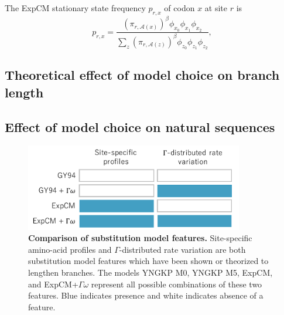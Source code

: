 \documentclass[11pt]{article}
\begin{document}
The ExpCM stationary state frequency $p_{r,x}$ of codon $x$ at site $r$ is~\citep{bloom2017identification} 
\begin{equation}
\label{eq:p_rx}
p_{r,x} = \frac{\left(\pi_{r,\mathcal{A}\left(x\right)}\right)^{\beta} \phi_{x_0} \phi_{x_1} \phi_{x_2}}{\sum_z \left(\pi_{r,\mathcal{A}\left(z\right)}\right)^{\beta} \phi_{z_0} \phi_{z_1} \phi_{z_2}},
\end{equation}
\subsection*{Theoretical effect of model choice on branch length}
\subsection*{Effect of model choice on natural sequences}

\begin{figure}
\centerline{\includegraphics[width=0.85\textwidth]{figures/model_feature}}
\caption{\label{model_feature}
\textbf{Comparison of substitution model features.}
Site-specific amino-acid profiles and $\Gamma$-distributed rate variation are both substitution model features which have been shown or theorized to lengthen branches. 
The models YNGKP M0, YNGKP M5, ExpCM, and ExpCM+$\Gamma\omega$ represent all possible combinations of these two features. 
Blue indicates presence and white indicates absence of a feature. 
}
\end{figure}
\end{document}
